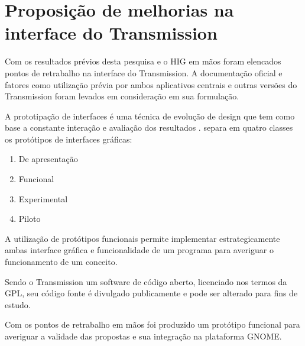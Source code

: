 
\section{Proposição de melhorias na interface do Transmission}

Com os resultados prévios desta pesquisa e o HIG em mãos foram elencados pontos
de retrabalho na interface do Transmission. A documentação oficial e fatores
como utilização prévia por ambos aplicativos centrais e outras versões do
Transmission foram levados em consideração em sua formulação.

A prototipação de interfaces é uma técnica de evolução de design que tem como
base a constante interação e avaliação dos resultados \cite{de2009client}.
 separa em quatro classes os protótipos de
interfaces gráficas:

\begin{enumerate}
  \item De apresentação
  \item Funcional
  \item Experimental
  \item Piloto
\end{enumerate}

A utilização de protótipos funcionais permite implementar estrategicamente ambas
interface gráfica e funcionalidade de um programa para averiguar o funcionamento
de um conceito.

Sendo o Transmission um software de código aberto, licenciado nos termos da GPL,
seu código fonte é divulgado publicamente e pode ser alterado para fins de
estudo.

Com os pontos de retrabalho em mãos foi produzido um protótipo funcional para
averiguar a validade das propostas e sua integração na plataforma GNOME.
